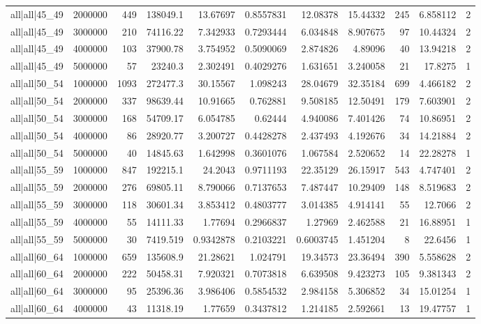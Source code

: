 \begin{tabular}{lrrrrrrrrrr}
all|all|45\_49 & 2000000 & 449 & 138049.1 & 13.67697 & 0.8557831 & 12.08378 & 15.44332 & 245 & 6.858112 & 2 \\
all|all|45\_49 & 3000000 & 210 & 74116.22 & 7.342933 & 0.7293444 & 6.034848 & 8.907675 & 97 & 10.44324 & 2 \\
all|all|45\_49 & 4000000 & 103 & 37900.78 & 3.754952 & 0.5090069 & 2.874826 & 4.89096 & 40 & 13.94218 & 2 \\
all|all|45\_49 & 5000000 & 57 & 23240.3 & 2.302491 & 0.4029276 & 1.631651 & 3.240058 & 21 & 17.8275 & 1 \\
all|all|50\_54 & 1000000 & 1093 & 272477.3 & 30.15567 & 1.098243 & 28.04679 & 32.35184 & 699 & 4.466182 & 2 \\
all|all|50\_54 & 2000000 & 337 & 98639.44 & 10.91665 & 0.762881 & 9.508185 & 12.50491 & 179 & 7.603901 & 2 \\
all|all|50\_54 & 3000000 & 168 & 54709.17 & 6.054785 & 0.62444 & 4.940086 & 7.401426 & 74 & 10.86951 & 2 \\
all|all|50\_54 & 4000000 & 86 & 28920.77 & 3.200727 & 0.4428278 & 2.437493 & 4.192676 & 34 & 14.21884 & 2 \\
all|all|50\_54 & 5000000 & 40 & 14845.63 & 1.642998 & 0.3601076 & 1.067584 & 2.520652 & 14 & 22.28278 & 1 \\
all|all|55\_59 & 1000000 & 847 & 192215.1 & 24.2043 & 0.9711193 & 22.35129 & 26.15917 & 543 & 4.747401 & 2 \\
all|all|55\_59 & 2000000 & 276 & 69805.11 & 8.790066 & 0.7137653 & 7.487447 & 10.29409 & 148 & 8.519683 & 2 \\
all|all|55\_59 & 3000000 & 118 & 30601.34 & 3.853412 & 0.4803777 & 3.014385 & 4.914141 & 55 & 12.7066 & 2 \\
all|all|55\_59 & 4000000 & 55 & 14111.33 & 1.77694 & 0.2966837 & 1.27969 & 2.462588 & 21 & 16.88951 & 1 \\
all|all|55\_59 & 5000000 & 30 & 7419.519 & 0.9342878 & 0.2103221 & 0.6003745 & 1.451204 & 8 & 22.6456 & 1 \\
all|all|60\_64 & 1000000 & 659 & 135608.9 & 21.28621 & 1.024791 & 19.34573 & 23.36494 & 390 & 5.558628 & 2 \\
all|all|60\_64 & 2000000 & 222 & 50458.31 & 7.920321 & 0.7073818 & 6.639508 & 9.423273 & 105 & 9.381343 & 2 \\
all|all|60\_64 & 3000000 & 95 & 25396.36 & 3.986406 & 0.5854532 & 2.984158 & 5.306852 & 34 & 15.01254 & 1 \\
all|all|60\_64 & 4000000 & 43 & 11318.19 & 1.77659 & 0.3437812 & 1.214185 & 2.592661 & 13 & 19.47757 & 1 \\

\end{tabular}
